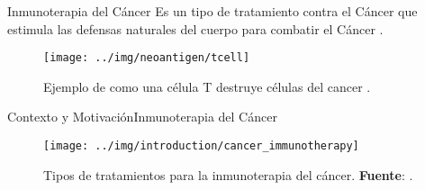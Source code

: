 \documentclass[10pt]{beamer}
\newcommand{\1}{
	\setbeamertemplate{background}{
		\texttt{[image: img/1]}
		\tikz[overlay] \fill[fill opacity=0.75,fill=white] (0,0) rectangle (-\paperwidth,\paperheight);
	}
}
\begin{document}
	












\begin{frame}{Inmunoterapia del Cáncer}{}		
	Es un tipo de tratamiento contra el Cáncer que estimula las defensas naturales del cuerpo para combatir el Cáncer \cite{inmunoterapy2022}.
		
	\begin{figure}
		\texttt{[image: ../img/neoantigen/tcell]}
		\caption{Ejemplo de como una célula T destruye células del cancer \cite{nortshore2022}.}
	\end{figure}		
\end{frame}


\begin{frame}{Contexto y Motivación}{Inmunoterapia del Cáncer}
	
	
	\begin{figure}[]
		\centering
		\texttt{[image: ../img/introduction/cancer\_immunotherapy]}
		\caption{Tipos de tratamientos para la inmunoterapia del cáncer. \textbf{Fuente}: \cite{kciuk2023recent}.}
	\end{figure}
\end{frame}
\end{document}
